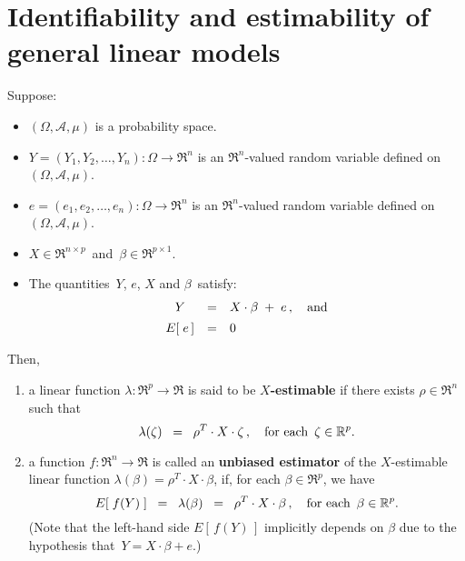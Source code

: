 

\section{Identifiability and estimability of general linear models}
\setcounter{theorem}{0}
\setcounter{equation}{0}

\renewcommand{\theenumi}{\roman{enumi}}
\renewcommand{\labelenumi}{\textnormal{(\theenumi)}$\;\;$}


\begin{definition}
\mbox{}
\vskip 0.2cm
\noindent
Suppose:
\begin{itemize}
\item
	$(\Omega,\mathcal{A},\mu)$ is a probability space.
\item
	$Y = (Y_{1}, Y_{2}, \ldots, Y_{n}) : \Omega \longrightarrow \Re^{n}$ is an $\Re^{n}$-valued random variable
	defined on $(\Omega,\mathcal{A},\mu)$.
\item
	$e = (e_{1}, e_{2}, \ldots, e_{n}) : \Omega \longrightarrow \Re^{n}$ is an $\Re^{n}$-valued random variable
	defined on $(\Omega,\mathcal{A},\mu)$.
\item
	$X \in \Re^{n \times p}$\, and \,$\beta \in \Re^{p \times 1}$.
\item
	The quantities \,$Y$, $e$, $X$ and $\beta$\, satisfy:
	\begin{equation*}
	\begin{array}{ccl}
	Y & = & X \cdot \beta \; + \; e\,, \quad\textnormal{and}
	\\
	E\!\left[\;e\,\right] & \overset{{\color{white}\vert}}{=} & 0
	\end{array}
	\end{equation*}
\end{itemize}
Then,
\begin{enumerate}
\item
	a linear function $\lambda : \Re^{p} \longrightarrow \Re$ is said to be \textbf{$X$-estimable}
	if there exists $\rho \in \Re^{n}$ such that
	\begin{equation*}
	\lambda(\zeta) \;\; =\;\; \rho^{T} \cdot X \cdot \zeta\,,
	\quad
	\textnormal{for each \,$\zeta \in \Re^{p}$}.
	\end{equation*}
\item
	a function $f : \Re^{n} \longrightarrow \Re$ is called an \textbf{unbiased estimator}
	of the $X$-estimable linear function $\lambda(\beta) = \rho^{T} \cdot X \cdot \beta$,
	if, for each $\beta \in \Re^{p}$, we have
	\begin{equation*}
	E\!\left[\;f(Y)\;\right] \;\; =\;\; \lambda(\beta) \;\;=\;\; \rho^{T} \cdot X \cdot \beta\,,
	\quad
	\textnormal{for each \,$\beta \in \Re^{p}$}.
	\end{equation*}
	(Note that the left-hand side $E\!\left[\,f(Y)\,\right]$ implicitly depends on $\beta$
	due to the hypothesis that \,$Y = X \cdot \beta + e$.)
\end{enumerate}
\end{definition}


